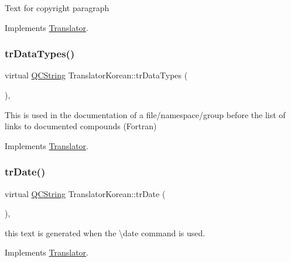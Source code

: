 Text for copyright paragraph 

Implements \mbox{\hyperlink{class_translator}{Translator}}.

\mbox{\label{class_translator_korean_ad7520d47e583017a1bcbdce8e2864bb0}} 
\subsubsection{\texorpdfstring{trDataTypes()}{trDataTypes()}}
{\footnotesize\ttfamily virtual \mbox{\hyperlink{class_q_c_string}{Q\+C\+String}} Translator\+Korean\+::tr\+Data\+Types (\begin{DoxyParamCaption}{ }\end{DoxyParamCaption})\hspace{0.3cm}{\ttfamily [inline]}, {\ttfamily [virtual]}}

This is used in the documentation of a file/namespace/group before the list of links to documented compounds (Fortran) 

Implements \mbox{\hyperlink{class_translator}{Translator}}.

\mbox{\label{class_translator_korean_ac3617be636d998b8ce4abc44d69c2f71}} 
\subsubsection{\texorpdfstring{trDate()}{trDate()}}
{\footnotesize\ttfamily virtual \mbox{\hyperlink{class_q_c_string}{Q\+C\+String}} Translator\+Korean\+::tr\+Date (\begin{DoxyParamCaption}{ }\end{DoxyParamCaption})\hspace{0.3cm}{\ttfamily [inline]}, {\ttfamily [virtual]}}

this text is generated when the \textbackslash{}date command is used. 

Implements \mbox{\hyperlink{class_translator}{Translator}}.

\mbox{\label{class_translator_korean_abf39ae7ff1f7844473f9091eed4f5888}} 
